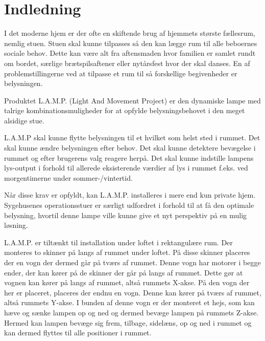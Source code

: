\chapter{Indledning}

I det moderne hjem er der ofte en skiftende brug af hjemmets største fællesrum, nemlig stuen. Stuen skal kunne tilpasses så den kan lægge rum til alle beboernes sociale behov. Dette kan være alt fra aftensmaden hvor familien er samlet rundt om bordet, særlige brætspilsaftener eller nytårsfest hvor der skal danses. En af problemstillingerne ved at tilpasse et rum til så forskellige begivenheder er belysningen.

Produktet L.A.M.P. (Light And Movement Project) er den dynamiske lampe med talrige kombinationsmuligheder for at opfylde belysningsbehovet i den meget alsidige stue. 

L.A.M.P skal kunne flytte belysningen til et hvilket som helst sted i rummet. Det skal kunne ændre belysningen efter behov. Det skal kunne detektere bevægelse i rummet og efter brugerens valg reagere herpå. Det skal kunne indstille lampens lys-output i forhold til allerede eksisterende værdier af lys i rummet f.eks. ved morgentimerne under sommer-/vintertid.  

Når disse krav er opfyldt, kan L.A.M.P. installeres i mere end kun private hjem. Sygehusenes operationsstuer er særligt udfordret i forhold til at få den optimale belysning, hvortil denne lampe ville kunne give et nyt perspektiv på en mulig løsning. 

L.A.M.P. er tiltænkt til installation under loftet i rektangulære rum. Der monteres to skinner på langs af rummet under loftet. På disse skinner placeres der en vogn der dermed går på tværs af rummet. Denne vogn har motorer i begge ender, der kan kører på de skinner der går på langs af rummet. Dette gør at vognen kan kører på langs af rummet, altså rummets X-akse. På den vogn der her er placeret, placeres der endnu en vogn. Denne kan kører på tværs af rummet, altså rummets Y-akse. I bunden af denne vogn er der monteret et hejs, som kan hæve og sænke lampen op og ned og dermed bevæge lampen på rummets Z-akse. Hermed kan lampen bevæge sig frem, tilbage, sidelæns, op og ned i rummet og kan dermed flyttes til alle positioner i rummet. 

